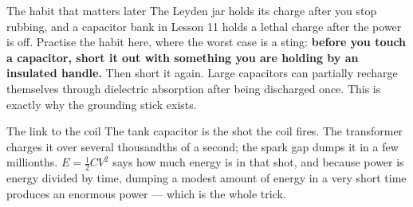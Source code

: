 \begin{teloshazard}{The habit that matters later}
The Leyden jar holds its charge after you stop rubbing, and a capacitor bank in
Lesson 11 holds a lethal charge after the power is off. Practise the habit here,
where the worst case is a sting: \textbf{before you touch a capacitor, short it
out with something you are holding by an insulated handle.} Then short it again.
Large capacitors can partially recharge themselves through dielectric absorption
after being discharged once. This is exactly why the grounding stick exists.
\end{teloshazard}

\begin{telospanel}{The link to the coil}
The tank capacitor is the shot the coil fires. The transformer charges it over
several thousandths of a second; the spark gap dumps it in a few millionths.
$E = \tfrac{1}{2}CV^2$ says how much energy is in that shot, and because power
is energy divided by time, dumping a modest amount of energy in a very short
time produces an enormous power --- which is the whole trick.
\end{telospanel}
\lowvoltagenote

